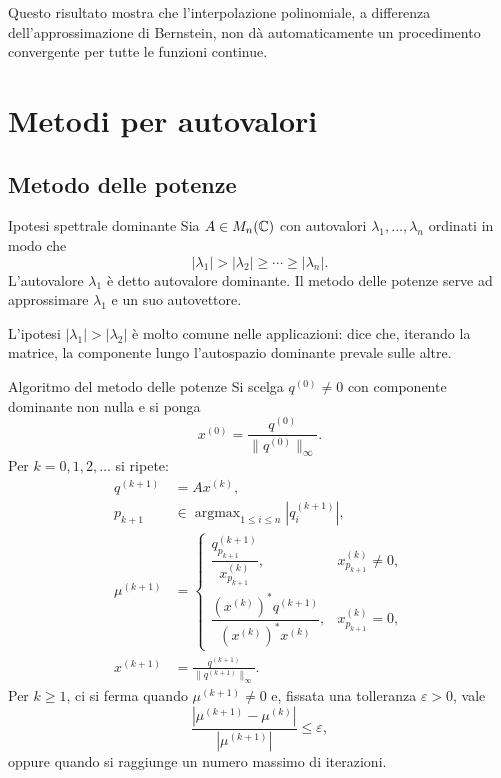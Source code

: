 \documentclass[a4paper]{article}
\begin{document}
Questo risultato mostra che l'interpolazione polinomiale, a differenza dell'approssimazione di Bernstein, non dà automaticamente un procedimento convergente per tutte le funzioni continue.

\section{Metodi per autovalori}

\subsection{Metodo delle potenze}

\begin{snippetdefinition}{Ipotesi spettrale dominante}
    Sia \(A\in M_n(\mathbb{C})\) con autovalori \(\lambda_1,
    \ldots,\lambda_n\) ordinati in modo che
    \[
        |\lambda_1|>|\lambda_2|\geq\cdots\geq |\lambda_n|.
    \]
    L'autovalore \(\lambda_1\) è detto autovalore dominante. Il metodo delle potenze serve ad approssimare \(\lambda_1\) e un suo autovettore.
\end{snippetdefinition}

L'ipotesi \(|\lambda_1|>|\lambda_2|\) è molto comune nelle applicazioni: dice che, iterando la matrice, la componente lungo l'autospazio dominante prevale sulle altre.

\begin{snippetdefinition}{Algoritmo del metodo delle potenze}
    Si scelga \(q^{(0)}\neq 0\) con componente dominante non nulla e si ponga
    \[
        x^{(0)}=\frac{q^{(0)}}{\|q^{(0)}\|_\infty}.
    \]
    Per \(k=0,1,2,\ldots\) si ripete:
    \begin{align*}
        q^{(k+1)}&=Ax^{(k)},\\
        p_{k+1}&\in\operatorname{argmax}_{1\leq i\leq n}\left|q_i^{(k+1)}\right|,\\
        \mu^{(k+1)}&=
        \begin{cases}
            \dfrac{q_{p_{k+1}}^{(k+1)}}{x_{p_{k+1}}^{(k)}}, & x_{p_{k+1}}^{(k)}\neq 0,\\
            \dfrac{(x^{(k)})^*q^{(k+1)}}{(x^{(k)})^*x^{(k)}}, & x_{p_{k+1}}^{(k)}=0,
        \end{cases}\\
        x^{(k+1)}&=
        \frac{q^{(k+1)}}{\|q^{(k+1)}\|_\infty}.
    \end{align*}
    Per \(k\geq 1\), ci si ferma quando \(\mu^{(k+1)}\neq 0\) e, fissata una tolleranza \(\varepsilon>0\), vale
    \[
        \frac{|\mu^{(k+1)}-\mu^{(k)}|}{|\mu^{(k+1)}|}\leq \varepsilon,
    \]
    oppure quando si raggiunge un numero massimo di iterazioni.
\end{snippetdefinition}
\end{document}
